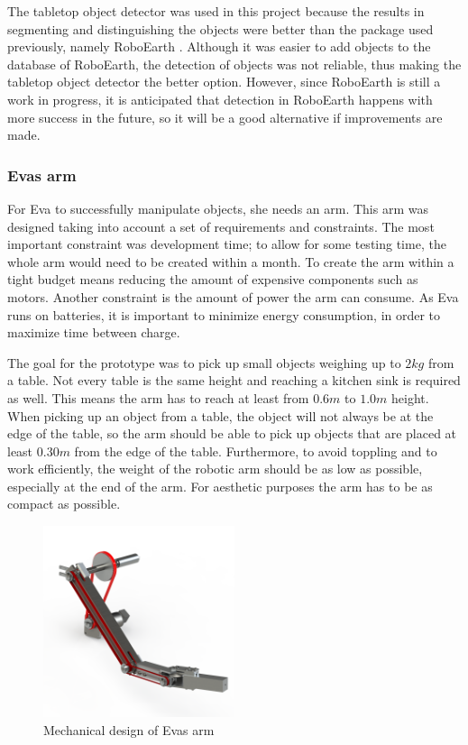 \documentclass[project_eva.tex]{subfiles}
\begin{document}
The tabletop object detector was used in this project because the results in segmenting and distinguishing the objects 
were better than the package used previously, namely RoboEarth \cite{Roboearth}. Although it was easier to add objects to 
the database of RoboEarth, the detection of objects was not reliable, thus making the tabletop object detector the 
better option. However, since RoboEarth is still a work in progress, it is anticipated that detection in RoboEarth 
happens with more success in the future, so it will be a good alternative if improvements are made.

\subsubsection*{Eva\textquotesingle s arm}
For Eva to successfully manipulate objects, she needs an arm. This arm was designed taking into account a set of 
requirements and constraints. The most important constraint was development time; to allow for some testing time, the 
whole arm would need to be created within a month. To create the arm within a tight budget means reducing the amount of 
expensive components such as motors. Another constraint is the amount of power the arm can consume. As Eva runs on 
batteries, it is important to minimize energy consumption, in order to maximize time between charge.

The goal for the prototype was to pick up small objects weighing up to $2kg$ from a table. Not every table is the same 
height and reaching a kitchen sink is required as well. This means the arm has to reach at least from $0.6m$ to $1.0m$ 
height. When picking up an object from a table, the object will not always be at the edge of the table, so the arm should 
be able to pick up objects that are placed at least $0.30m$ from the edge of the table. Furthermore, to avoid toppling 
and to work efficiently, the weight of the robotic arm should be as low as possible, especially at the end of the arm. 
For aesthetic purposes the arm has to be as compact as possible.

\begin{figure}[h]
	\centering
	\mbox{\includegraphics[width=0.5\textwidth]{Images/armMechOverview.png}}
	\caption{Mechanical design of Eva\textquotesingle s arm}
	\label{fig:armMechOverview}
\end{figure}
\end{document}
